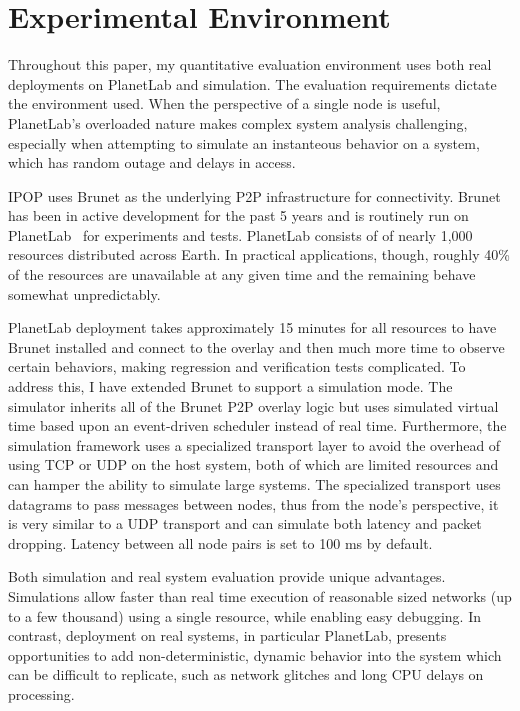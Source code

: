 \section{Experimental Environment}
\label{vpn:experimental}

Throughout this paper, my quantitative evaluation environment uses both real
deployments on PlanetLab and simulation.  The evaluation requirements dictate
the environment used.  When the perspective of a single node is useful,
PlanetLab's overloaded nature makes complex system analysis challenging,
especially when attempting to simulate an instanteous behavior on a system,
which has random outage and delays in access.

IPOP uses Brunet as the underlying P2P infrastructure for connectivity.  Brunet
has been in active development for the past 5 years and is routinely run on
PlanetLab~\cite{planetlab} for experiments and tests.  PlanetLab consists of of
nearly 1,000 resources distributed across Earth.  In practical applications,
though, roughly 40\% of the resources are unavailable at any given time and the
remaining behave somewhat unpredictably.

PlanetLab deployment takes approximately 15 minutes for all resources to have
Brunet installed and connect to the overlay and then much more time to observe
certain behaviors, making regression and verification tests complicated.  To
address this, I have extended Brunet to support a simulation mode. The
simulator inherits all of the Brunet P2P overlay logic but uses simulated
virtual time based upon an event-driven scheduler instead of real time.
Furthermore, the simulation framework uses a specialized transport layer to
avoid the overhead of using TCP or UDP on the host system, both of which are
limited resources and can hamper the ability to simulate large systems.   The
specialized transport uses datagrams to pass messages between nodes, thus from
the node's perspective, it is very similar to a UDP transport and can simulate
both latency and packet dropping.  Latency between all node pairs is set to 100
ms by default.

Both simulation and real system evaluation provide unique advantages.
Simulations allow faster than real time execution of reasonable sized networks
(up to a few thousand) using a single resource, while enabling easy debugging.
In contrast, deployment on real systems, in particular PlanetLab, presents
opportunities to add non-deterministic, dynamic behavior into the system which
can be difficult to replicate, such as network glitches and long CPU delays on
processing.

